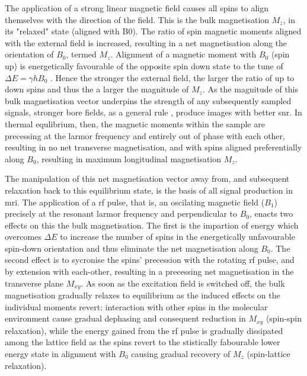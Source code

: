 The application of a strong linear magnetic field causes all spins to align themselves with the direction of the field. This is the bulk magnetisation $M_z$, in its "relaxed" state (aligned with B0).
The ratio of spin magnetic moments aligned with the external field is increased,  resulting in a net magnetisation along the orientation of $B_0$, termed $M_z$.
Alignment of a magnetic moment with $B_0$ (spin up) is energetically favourable of the opposite spin down state to the tune of $\Delta E = \gamma h B_0$ .
Hence the stronger the external field, the larger the ratio of up to down spins and thus the a larger the magnitude of $M_z$.
As the magnitude of this bulk magnetisation vector underpins the strength of any subsequently sampled signals, stronger bore fields, as a general rule , produce images with better \gls{snr}.
In thermal equlibrium, then, the magnetic moments within the sample are precessing at the larmor frequency and entirely out of phase with each other, resulting in no net transverse magnetisation, and with spins aligned preferentially along $B_0$, resulting in maximum longitudinal magnetisation $M_z$.

The manipulation of this net magnetisation vector away from, and subsequent relaxation back to this equilibrium state, is the basis of all signal production in \gls{mri}.
The application of a \gls{rf} pulse, that is, an oscilating magnetic field ($B_1$) precisely at the resonant larmor frequency and perpendicular to $B_0$, enacts two effects on this the bulk magnetisation.
The first is the impartion  of energy which overcomes $\Delta E$  to increase the number of spins in the energetically unfavourable spin-down orientation and thus eliminate the net magnetisation along $B_0$.
The second effect is to sycronise the spins' precession with the rotating \gls{rf} pulse, and by extension with each-other, resulting in a precessing net magnetisation in the transverse plane $M_{xy}$.
As soon as the excitation field is switched off, the bulk magnetisation gradually relaxes to equilibrium as the induced effects on the individual moments revert:
interaction with other spins  in the molecular environment cause gradual dephasing and consequent reduction in $M_{xy}$ (spin-spin relaxation), while the energy gained from the \gls{rf} pulse is gradually dissipated among the lattice field  as the spins revert to the stistically fabourable lower energy state in alignment with $B_0$ causing gradual recovery of $M_z$ (spin-lattice relaxation).

